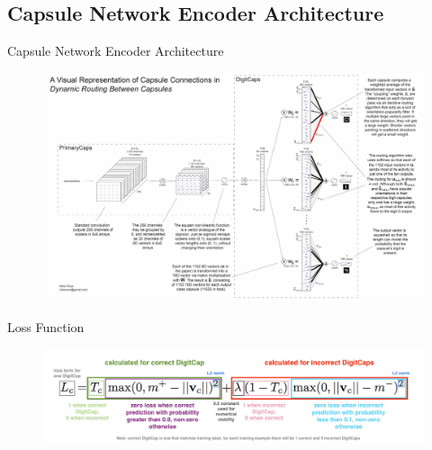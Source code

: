 \documentclass{beamer}
\begin{document}
\subsection{Capsule Network Encoder Architecture}
\begin{frame}{Capsule Network Encoder Architecture}
    \begin{figure}
        \centering
        \includegraphics[scale=0.4]{capnet_visual.JPG}
    \end{figure}
\end{frame}

\begin{frame}{Loss Function}
    \begin{figure}
        \centering
        \includegraphics[scale=0.55]{loss.JPG}
    \end{figure}
\end{frame}
\end{document}
